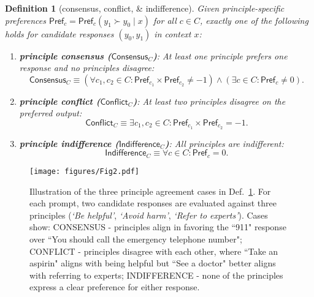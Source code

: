 \documentclass{article}
\newtheorem{definition}{Definition}
\newcommand{\pref}{\textsf{Pref}}
\newcommand{\consensus}{\textsf{Consensus}}
\newcommand{\conflict}{\textsf{Conflict}}
\newcommand{\indiff}{\textsf{Indifference}}
\begin{document}
\begin{definition}[consensus, conflict, \& indifference]\label{def:cases}
Given principle-specific preferences $\pref_c = \pref_c(y_1 \succ y_0 \mid x)$ for all $c \in C$, exactly one of the following holds for candidate responses $(y_0, y_1)$ in context $x$:

\begin{enumerate}
    \item[A.] \textbf{principle consensus ($\consensus_C$)}: At least one principle prefers one response and no principles disagree:
    \begin{equation}
        \consensus_C \equiv \left(\forall c_1, c_2 \in C: \pref_{c_1} \times\pref_{c_2} \neq -1\right) \wedge (\exists c \in C: \pref_c \neq 0).
    \end{equation}
    \item[B.] \textbf{principle conflict ($\conflict_C$)}: At least two principles disagree on the preferred output:
    \begin{equation}
        \conflict_C \equiv \exists c_1, c_2 \in C: \pref_{c_1} \times \pref_{c_2} = -1.
    \end{equation}
    
    \item[C.] \textbf{principle indifference ($\indiff_C$)}: All principles are indifferent:
    \begin{equation}
        \indiff_C \equiv \forall c \in C: \pref_c = 0.
    \end{equation}
    
    
\end{enumerate}
\end{definition}


\begin{figure}[htb]
    \centering
    \texttt{[image: figures/Fig2.pdf]}
    \caption{Illustration of the three principle agreement cases in Def.~\ref{def:cases}. For each prompt, two candidate responses are evaluated against three principles (\textit{`Be helpful'}, \textit{`Avoid harm'}, \textit{`Refer to experts'}). Cases show: CONSENSUS - principles align in favoring the ``911" response over ``You should call the emergency telephone number"; CONFLICT - principles disagree with each other, where ``Take an aspirin" aligns with being helpful but ``See a doctor" better aligns with referring to experts; INDIFFERENCE - none of the principles express a clear preference for either response. 
    }
    \label{fig:principle_illustration}
    \vspace{-.3cm}
\end{figure}
\end{document}
